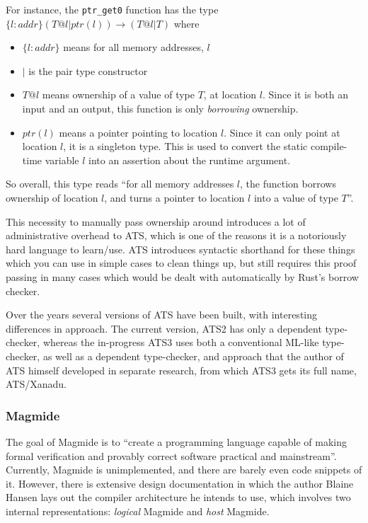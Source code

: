 \documentclass[12pt,twoside]{report}
\begin{document}
For instance, the \verb|ptr_get0| function has the type $\{l:addr\} (T @ l | ptr (l)) \rightarrow (T @ l | T)$ where
\begin{itemize}
  \item $\{l:addr\}$ means for all memory addresses, $l$
  \item $|$ is the pair type constructor
  \item $T @ l$ means ownership of a value of type $T$, at location $l$. Since it is both an input and an output, this function is only \textit{borrowing} ownership.
  \item $ptr(l)$ means a pointer pointing to location $l$. Since it can only point at location $l$, it is a singleton type. This is used to convert the static compile-time variable $l$ into an assertion about the runtime argument.
\end{itemize}


So overall, this type reads ``for all memory addresses $l$, the function borrows ownership of location $l$, and turns a pointer to location $l$ into a value of type $T$''.

This necessity to manually pass ownership around introduces a lot of administrative overhead to ATS, which is one of the reasons it is a notoriously hard language to learn/use. ATS introduces syntactic shorthand for these things which you can use in simple cases to clean things up, but still requires this proof passing in many cases which would be dealt with automatically by Rust's borrow checker.

Over the years several versions of ATS have been built, with interesting differences in approach. The current version, ATS2 has only a dependent type-checker, whereas the in-progress ATS3 uses both a conventional ML-like type-checker, as well as a dependent type-checker, and approach that the author of ATS himself developed in separate research, from which ATS3 gets its full name, ATS/Xanadu.

\subsubsection{Magmide}
The goal of Magmide \citep{noauthor_magmidemagmide_2024} is to ``create a programming language capable of making formal verification and provably correct software practical and mainstream''. Currently, Magmide is unimplemented, and there are barely even code snippets of it. However, there is extensive design documentation in which the author Blaine Hansen lays out the compiler architecture he intends to use, which involves two internal representations: \textit{logical} Magmide and \textit{host} Magmide.
\end{document}
